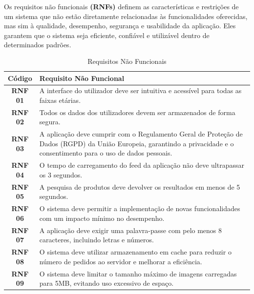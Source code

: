 \documentclass[a4paper, 12pt]{article} %
\begin{document}
Os requisitos não funcionais \textbf{(RNFs)} definem as características e restrições de um sistema que não estão diretamente relacionadas às funcionalidades oferecidas, mas sim à qualidade, desempenho, segurança e usabilidade da aplicação. Eles garantem que o sistema seja eficiente, confiável e utilizável dentro de determinados padrões.

\begin{table}[H]
	\centering
	\renewcommand{\arraystretch}{1.3}
	\begin{tabular}{|c|p{12cm}|}
		\hline
		\textbf{Código} & \textbf{Requisito Não Funcional} \\
		\hline
		\textbf{RNF 01} & A interface do utilizador deve ser intuitiva e acessível para todas as faixas etárias. \\
		\hline
		\textbf{RNF 02} & Todos os dados dos utilizadores devem ser armazenados de forma segura. \\
		\hline
		\textbf{RNF 03} & 	A aplicação deve cumprir com o Regulamento Geral de Proteção de Dados (RGPD) da União Europeia, garantindo a privacidade e o consentimento para o uso de dados pessoais. \\
		\hline
		\textbf{RNF 04} & O tempo de carregamento do feed da aplicação não deve ultrapassar os 3 segundos. \\
		\hline
		\textbf{RNF 05} & A pesquisa de produtos deve devolver os resultados em menos de 5 segundos.\\
		\hline
		\textbf{RNF 06} & O sistema deve permitir a implementação de novas funcionalidades com um impacto mínimo no desempenho. \\
		\hline
		\textbf{RNF 07} & A aplicação deve exigir uma palavra-passe com pelo menos 8 caracteres, incluindo letras e números. \\
		\hline
		\textbf{RNF 08} & O sistema deve utilizar armazenamento em cache para reduzir o número de pedidos ao servidor e melhorar a eficiência. \\
		\hline
		\textbf{RNF 09} & O sistema deve limitar o tamanho máximo de imagens carregadas para 5MB, evitando uso excessivo de espaço. \\
		\hline
	\end{tabular}
	\caption{Requisitos Não Funcionais}
	\label{tab:requisitos_nao_funcionais}
\end{table}


\newpage
\end{document}
